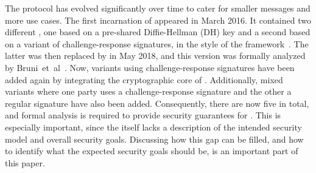 \documentclass[runningheads, envcountsame, a4paper, draft, x11names]{llncs}
\newcommand{\spacehack}{\vspace{-1em}}
\begin{document}
The \mEdhoc{} protocol has evolved significantly over time to cater for smaller messages and more use cases.
%
The first incarnation of \mEdhoc{} appeared in March 2016.
%
It contained two different , one based on a
pre-shared Diffie-Hellman (DH) key and a second based on a variant of
challenge-response signatures, in the style of the \mNoise{}
framework~\cite{perrin2016noise}.
%
The latter was then replaced by \mSigma{} in May 2018, and this version was formally analyzed by Bruni~et~al~\cite{DBLP:conf/secsr/BruniJPS18}.
%
Now, variants using challenge-response signatures have been added again by integrating the cryptographic core of \mOptls{}.
%
Additionally, mixed variants where one party uses a challenge-response
signature and the other a regular signature have also been added.
%
Consequently, there are now five  in total, and formal analysis is required to provide security guarantees for \mEdhoc.
%
This is especially important, since the \mSpec{} itself lacks a description
of the intended security model and overall security goals.
%
Discussing how this gap can be filled, and how to identify what the expected security goals should be, is an important part of this paper.
%

\spacehack
\end{document}

